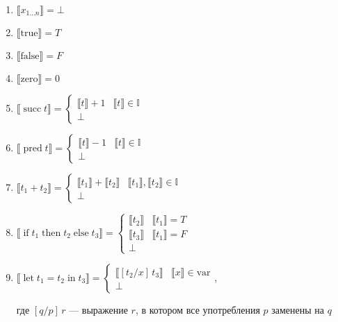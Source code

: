 \documentclass{article}
\DeclareMathOperator{\tsucc}{succ}
\DeclareMathOperator{\tpred}{pred}
\DeclareMathOperator{\tlet}{let}
\DeclareMathOperator{\tin}{in}
\DeclareMathOperator{\tthen}{then}
\DeclareMathOperator{\telse}{else}
\DeclareMathOperator{\tif}{if}
\begin{document}
\begin{enumerate}
        \begin{enumerate}
            \item $\llbracket x_{1\dots n}\rrbracket = \bot$
            \item $\llbracket\mathrm{true}\rrbracket = T$
            \item $\llbracket\mathrm{false}\rrbracket = F$
            \item $\llbracket\mathrm{zero}\rrbracket = 0$
            \item $\llbracket\tsucc t\rrbracket = \begin{cases}
                \llbracket t\rrbracket + 1& \llbracket t\rrbracket \in \mathbb{I}\\
                \bot
            \end{cases}$
            \item $\llbracket\tpred t\rrbracket = \begin{cases}
                \llbracket t\rrbracket - 1& \llbracket t\rrbracket \in \mathbb{I}\\
                \bot
            \end{cases}$
            \item $\llbracket t_1 + t_2\rrbracket = \begin{cases}
                \llbracket t_1\rrbracket + \llbracket t_2\rrbracket & \llbracket t_1\rrbracket, \llbracket t_2\rrbracket \in \mathbb{I}\\
                \bot
            \end{cases}$
            \item $\llbracket\tif t_1 \tthen t_2 \telse t_3\rrbracket = \begin{cases}
                \llbracket t_2\rrbracket & \llbracket t_1\rrbracket = T\\
                \llbracket t_3\rrbracket & \llbracket t_1\rrbracket = F\\
                \bot
            \end{cases}$
            \item $\llbracket \tlet t_1 = t_2\tin t_3 \rrbracket = \begin{cases}
                \llbracket[t_2/x]\,t_3\rrbracket & \llbracket x \rrbracket \in\mathrm{var}\\
                \bot
            \end{cases}$, 
            
            где $[q/p]\,r$ — выражение $r$, в котором все употребления $p$ заменены на $q$
        \end{enumerate}


\end{enumerate}
\end{document}
